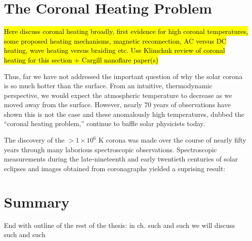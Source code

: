 \section{The Coronal Heating Problem}
\label{sec:heating}
\hl{Here discuss coronal heating broadly, first evidence for high coronal temperatures, some proposed heating mechanisms, magnetic reconnection, AC versus DC heating, wave heating versus braiding etc. Use Klimchuk review of coronal heating for this section + Cargill nanoflare paper(s)
}
%
\par Thus, far we have not addressed the important question of why the solar corona is so much hotter than the surface. From an intuitive, thermodynamic perspective, we would expect the atmospheric temperature to decrease as we moved away from the surface. However, nearly 70 years of observations have shown this is not the case and these anomalously high temperatures, dubbed the ``coronal heating problem,'' continue to baffle solar physicists today.
%
\par The discovery of the $>1\times10^6$ K corona was made over the course of nearly fifty years through many laborious spectroscopic observations. Spectroscopic measurements during the late-nineteenth and early twentieth centuries of solar eclipses and images obtained from coronagraphs yielded a suprising result:
\section{Summary}
\label{sec:summary}
%
End with outline of the rest of the thesis: in ch. such and such we will discuss such and such